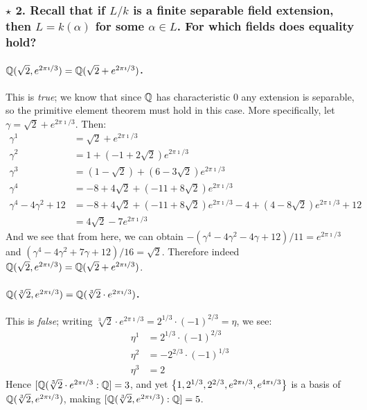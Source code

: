\subsubsection*{$\star$ 2. Recall that if $L / k$ is a finite separable field extension, then $L = k(\alpha)$ for some $\alpha \in L$. For which fields does equality hold?}

\paragraph*{$\mathbb{Q}(\sqrt{2}, e^{2\pi\imath / 3}) = \mathbb{Q}(\sqrt{2} + e^{2\pi\imath / 3})$.} This is \emph{true}; we know that since $\mathbb{Q}$ has characteristic $0$ any extension is separable, so the primitive element theorem must hold in this case. More specifically, let $\gamma = \sqrt{2} + e^{2 \pi \imath / 3}$. Then:
\begin{align*}
\gamma^1 &= \sqrt{2} + e^{2 \pi\imath / 3} \\
%
\gamma^2 &= 1 + (-1 + 2 \sqrt{2}) e^{2 \pi\imath / 3}\\
%
\gamma^3 &= (1 - \sqrt{2}) + (6 - 3\sqrt{2}) e^{2 \pi\imath / 3}\\  
%
\gamma^4 &= -8 + 4\sqrt{2} + (-11 + 8\sqrt{2}) e^{2 \pi\imath / 3}\\
%
\gamma^4 - 4 \gamma^2 + 12 &= -8 + 4\sqrt{2} + (-11 + 8\sqrt{2}) e^{2 \pi\imath / 3}
                              -4 + (4 - 8 \sqrt{2}) e^{2 \pi\imath / 3} + 12\\
                           &= 4\sqrt{2} - 7 e^{2 \pi\imath / 3}
\end{align*}
And we see that from here, we can obtain $-(\gamma^4 - 4 \gamma^2 - 4 \gamma + 12)/11 = e^{2 \pi \imath / 3}$ and $(\gamma^4 - 4 \gamma^2 + 7 \gamma + 12)/16 = \sqrt{2}$. Therefore indeed $\mathbb{Q}(\sqrt{2}, e^{2 \pi\imath / 3}) = \mathbb{Q}(\sqrt{2} + e^{2 \pi\imath / 3})$.

\paragraph*{$\mathbb{Q}(\sqrt[3]{2}, e^{2\pi\imath / 3}) = \mathbb{Q}(\sqrt[3]{2} \cdot e^{2\pi\imath / 3})$.} This is \emph{false}; writing $\sqrt[3]{2} \cdot e^{2\pi\imath / 3} = 2^{1/3} \cdot (-1)^{2/3} = \eta$, we see:
\begin{align*}
\eta^1 &= 2^{1/3} \cdot (-1)^{2/3}\\
%
\eta^2 &= -2^{2/3} \cdot (-1)^{1/3}\\
%
\eta^3 &= 2
\end{align*}
Hence $[\mathbb{Q}(\sqrt[3]{2}\cdot e^{2\pi\imath / 3} : \mathbb{Q}] = 3$, and yet $\left\{1, 2^{1/3}, 2^{2/3}, e^{2\pi\imath / 3}, e^{4\pi\imath / 3}\right\}$ is a basis of $\mathbb{Q}(\sqrt[3]{2}, e^{2\pi\imath / 3})$, making $[\mathbb{Q}(\sqrt[3]{2}, e^{2\pi\imath / 3}) : \mathbb{Q}] = 5$.

